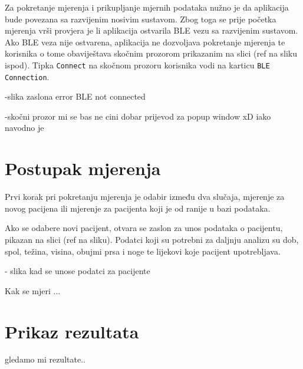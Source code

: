 \documentclass[../diplomski_rad.tex]{subfiles}
\begin{document}
Za pokretanje mjerenja i prikupljanje mjernih podataka nužno je da aplikacija bude povezana sa razvijenim nosivim sustavom. 
Zbog toga se prije početka mjerenja vrši provjera je li aplikacija ostvarila BLE vezu sa razvijenim sustavom. 
Ako BLE veza nije ostvarena, aplikacija ne dozvoljava pokretanje mjerenja te korisnika o tome obaviještava 
skočnim prozorom prikazanim na slici (ref na sliku ispod). Tipka \texttt{Connect} na skočnom prozoru korisnika 
vodi na karticu \texttt{BLE Connection}.

-slika zaslona error BLE not connected

-skočni prozor mi se bas ne cini dobar prijevod za popup window xD iako navodno je

\section{Postupak mjerenja}

Prvi korak pri pokretanju mjerenja je odabir između dva slučaja, mjerenje za novog pacijena ili 
mjerenje za pacijenta koji je od ranije u bazi podataka.

Ako se odabere novi pacijent, otvara se zaslon za unos podataka o pacijentu, pikazan na slici (ref na sliku). 
Podatci koji su potrebni za daljnju analizu su dob, spol, težina, visina, obujmi prsa i noge te lijekovi koje pacijent upotrebljava. 

- slika kad se unose podatci za pacijente



Kak se mjeri ...

\section{Prikaz rezultata}

gledamo mi rezultate..
\end{document}
